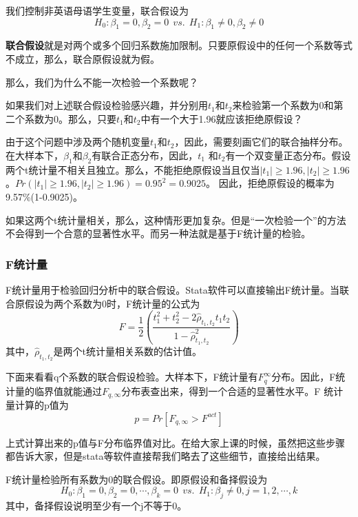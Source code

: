 \documentclass[cn,10pt,math=newtx,citestyle=gb7714-2015,bibstyle=gb7714-2015]{elegantbook}
\begin{document}
	我们控制非英语母语学生变量，联合假设为
	\begin{equation}
		H_0:\beta_1=0,\beta_2=0~~vs.~~H_1:\beta_1\neq0,\beta_2\neq0
	\end{equation}
	
	\textbf{联合假设}就是对两个或多个回归系数施加限制。只要原假设中的任何一个系数等式不成立，那么，联合原假设就为假。
	
	那么，我们为什么不能一次检验一个系数呢？
	
	如果我们对上述联合假设检验感兴趣，并分别用$t_1$和$t_2$来检验第一个系数为0和第二个系数为0。那么，只要$t_1$和$t_2$中有一个大于1.96就应该拒绝原假设？
	
	由于这个问题中涉及两个随机变量$t_1$和$t_2$，因此，需要刻画它们的联合抽样分布。在大样本下，$\beta_1$和$\beta_2$有联合正态分布，因此，$t_1$ 和$t_2$有一个双变量正态分布。假设两个t统计量不相关且独立。那么，不能拒绝原假设当且仅当$|t_1|\geq1.96,|t_2|\geq1.96$。$Pr(|t_1|\geq1.96,|t_2|\geq1.96)=0.95^2=0.9025$。 因此，拒绝原假设的概率为9.57\%(1-0.9025)。
	
	如果这两个t统计量相关，那么，这种情形更加复杂。但是“一次检验一个”的方法不会得到一个合意的显著性水平。而另一种法就是基于F统计量的检验。
	
	\subsubsection{F统计量}
	F统计量用于检验回归分析中的联合假设。Stata软件可以直接输出F统计量。当联合原假设为两个系数为0时，F统计量的公式为
	\begin{equation}
		F=\frac{1}{2}(\frac{t_1^2+t_2^2-2\hat{\rho}_{t_1,t_2}t_1t_2}{1-\hat{\rho}_{t_1,t_2}^2})
	\end{equation}
	其中，$\hat{\rho}_{t_1,t_2}$是两个t统计量相关系数的估计值。
	
	下面来看看q个系数的联合假设检验。大样本下，F统计量有$F_q^\infty$分布。因此，F统计量的临界值就能通过$F_{q,\infty}$分布表查出来，得到一个合适的显著性水平。F 统计量计算的p值为
	\begin{equation}
		p=Pr[F_{q,\infty}>F^{act}]
	\end{equation}
	
	上式计算出来的p值与F分布临界值对比。在给大家上课的时候，虽然把这些步骤都告诉大家，但是stata等软件直接帮我们略去了这些细节，直接给出结果。
	
	F统计量检验所有系数为0的联合假设。即原假设和备择假设为
	\begin{equation}
		H_0:\beta_1=0,\beta_2=0,\cdots,\beta_k=0~~vs.~~H_1:\beta_j\neq0,j=1,2,\cdots,k
	\end{equation}
	其中，备择假设说明至少有一个j不等于0。
	
\end{document}
